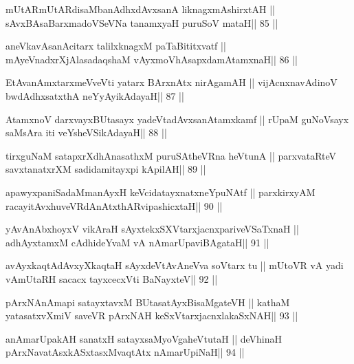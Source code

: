 \begin{shl}
mUtARmUtARdisaMbanAdhxdAvxsanA liknagxmAshirxtAH ||
sAvxBAsaBarxmadoVSeVNa tanamxyaH puruSoV mataH\hfill || 85 ||
\end{shl}

\begin{shl}
aneVkavAsanAcitarx talilxknagxM paTaBititxvatf ||
mAyeVnadxrXjAlasadaqshaM vAyxmoVhAsapxdamAtamxnaH\hfill || 86 ||
\end{shl}

\begin{shl}
EtAvanAmxtarxmeVveVti yatarx BArxnAtx nirAgamAH ||
vijAcnxnavAdinoV bwdAdhxsatxthA neYyAyikAdayaH\hfill || 87 ||
\end{shl}

\begin{shl}
AtamxnoV darxvayxBUtasayx yadeVtadAvxsanAtamxkamf ||
rUpaM guNoV\s sayx saMsAra iti veYsheVSikAdayaH\hfill || 88 ||
\end{shl}

\begin{shl}
tirxguNaM satapxrXdhAnasathxM puruSAtheVRna heVtunA ||
parxvataRteV savxtanatxrXM sadidamitayxpi kApilAH\hfill || 89 ||
\end{shl}

\begin{shl}
apawyxpaniSadaMmanAyxH keVcidatayxnatxneYpuNAtf ||
parxkirxyAM racayitAvx\s\s huveVRdAnAtxthARvipashicxtaH\hfill || 90 ||
\end{shl}

\begin{shl}
yAvAnAbxhoyxV vikAraH sAyxtekxSXVtarxjacnxpariveVSaTxnaH ||
adhAyxtamxM cAdhideYvaM vA nAmarUpaviBAgataH\hfill || 91 ||
\end{shl}

\begin{shl}
avAyxkaqtAdAvxyXkaqtaH sAyxdeVtAvAneVva soV\s tarx tu ||
mUtoVR vA yadi vA\s mUtaRH sacacx tayxcecxVti BaNayxteV\hfill || 92 ||
\end{shl}

\begin{shl}
pArxNAnAmapi satayxtavxM BUtasatAyxBisaMgateVH ||
kathaM yatasatxvXmiV saveVR pArxNAH keSxVtarxjacnxlakaSxNAH\hfill || 93 ||
\end{shl}

\begin{shl}
anAmarUpakAH sanatxH satayxsaMyoVgaheVtutaH ||
deVhinaH pArxNavatAsxkASxtasxMvaqtAtx nAmarUpiNaH\hfill || 94 ||
\end{shl}

